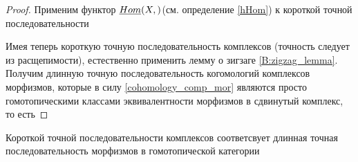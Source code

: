 \documentclass[../main.tex]{subfiles}
\begin{document}
\begin{proof}
  Применим функтор $\underline{Hom}(X,)$(см. определение \ref{hHom}) к короткой точной последовательности
\bee\label{3:cone_short_exact_eq}
\eee
\bee
\eee
Имея теперь короткую точную последовательность комплексов (точность следует из расщепимости), естественно применить лемму о зигзаге \ref{B:zigzag_lemma}. Получим длинную точную последовательность когомологий комплексов морфизмов, которые в силу \ref{cohomology_comp_mor} являются просто гомотопическими классами эквивалентности морфизмов в сдвинутый комплекс, то есть
\bee
{}
\eee
\end{proof}
\begin{to_lem}
    Короткой точной последовательности комплексов соответсвует длинная точная последовательность морфизмов в гомотопической категории
    \bee
{}
    \eee
\bee
{}
    \eee
\end{to_lem}
\end{document}
